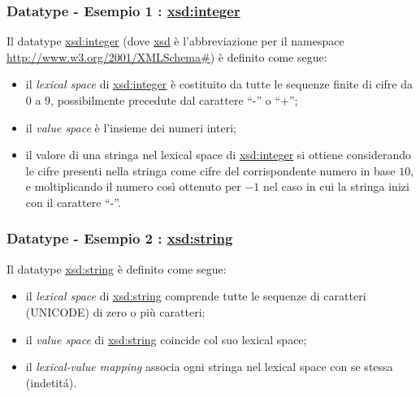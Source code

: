 \documentclass[8pt]{beamer}
\begin{document}
\begin{frame}
\frametitle{Datatype - Esempio 1 : \url{xsd:integer}}
Il datatype \url{xsd:integer} (dove \url{xsd} \`e l'abbreviazione per il namespace \url{http://www.w3.org/2001/XMLSchema\#})
\`e definito come segue:

\begin{itemize}
 \item il \emph{lexical space} di \url{xsd:integer} \`e costituito da tutte le sequenze finite di cifre da 0 a 9, possibilmente
 precedute dal carattere ``-'' o ``+'';
 \item il \emph{value space} \`e l'insieme dei numeri interi;
 \item il valore di una stringa nel lexical space di \url{xsd:integer} si ottiene considerando le cifre 
 presenti nella stringa come cifre del corrispondente numero in base $10$, e moltiplicando il numero cos\`i ottenuto per
 $-1$ nel caso in cui la stringa inizi con il carattere ``-''.
\end{itemize}
\end{frame}

\begin{frame}
\frametitle{Datatype - Esempio 2 : \url{xsd:string}}
Il datatype \url{xsd:string} \`e definito come segue:

\begin{itemize}
 \item il \emph{lexical space} di \url{xsd:string} comprende 
 tutte le sequenze di caratteri (UNICODE) di zero o pi\`u caratteri;
 \item il \emph{value space} di \url{xsd:string} coincide col suo 
 lexical space;
 \item il \emph{lexical-value mapping} associa ogni stringa nel lexical space
 con se stessa (indetit\'a).
 \end{itemize}
\end{frame}
\end{document}
